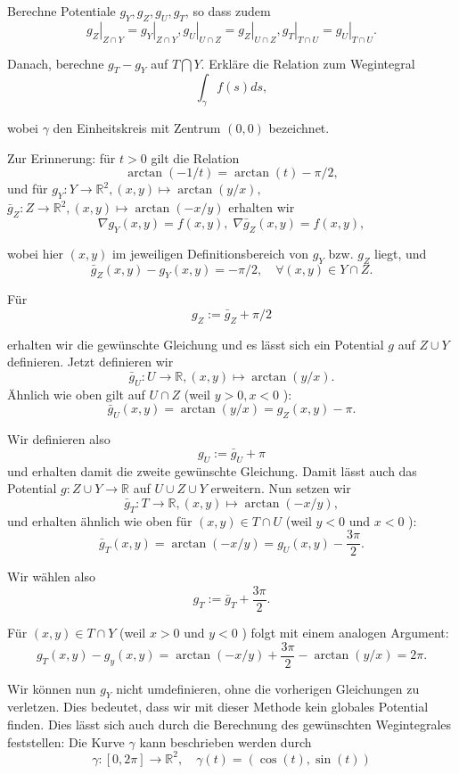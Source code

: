 Berechne Potentiale $g_{Y}, g_{Z}, g_{U}, g_{T}$, so dass zudem
$$
\left.g_{Z}\right|_{Z \cap Y}=\left.g_{Y}\right|_{Z \cap Y},\left.g_{U}\right|_{U \cap Z}=\left.g_{Z}\right|_{U \cap Z},\left.g_{T}\right|_{T \cap U}=\left.g_{U}\right|_{T \cap U} .
$$

Danach, berechne $g_{T}-g_{Y}$ auf $T \bigcap Y$. Erkläre die Relation zum Wegintegral
$$
\int_{\gamma} f(s) d s,
$$

wobei $\gamma$ den Einheitskreis mit Zentrum $(0,0)$ bezeichnet. \smallskip

Zur Erinnerung: für $t>0$ gilt die Relation
$$
\arctan (-1 / t)=\arctan (t)-\pi / 2,
$$
und für $g_{Y}: Y \rightarrow \mathbb{R}^{2},(x, y) \mapsto \arctan (y / x),$ 
$\bar{g}_{Z}: Z \rightarrow \mathbb{R}^{2},(x, y) \mapsto \arctan (-x / y)$ erhalten wir
$$
\nabla g_{Y}(x, y)=f(x, y), \; \nabla \bar{g}_{Z}(x, y)=f(x, y),
$$

wobei hier $(x, y)$ im jeweiligen Definitionsbereich von $g_{Y}$ bzw. $g_{Z}$ liegt, und
$$
\bar{g}_{Z}(x, y)-g_{Y}(x, y)=-\pi / 2, \quad \forall(x, y) \in Y \cap Z .
$$

Für
$$
g_{Z}:=\bar{g}_{Z}+\pi / 2
$$

erhalten wir die gewünschte Gleichung und es lässt sich ein Potential $g$ auf $Z \cup Y$ definieren. Jetzt definieren wir
$$
\bar{g}_{U}: U \rightarrow \mathbb{R},(x, y) \mapsto \arctan (y / x) .
$$
Ähnlich wie oben gilt auf $U \cap Z$ (weil $y>0, x<0$ ):
$$\bar{g}_{U}(x, y) =\arctan (y / x) = g_{Z}(x, y)-\pi .$$

Wir definieren also
$$
g_{U}:=\bar{g}_{U}+\pi
$$
und erhalten damit die zweite gewünschte Gleichung. Damit lässt auch das Potential $g: Z \cup Y \rightarrow \mathbb{R}$ auf $U \cup Z \cup Y$ erweitern. Nun setzen wir
$$
\bar{g}_{T}: T \rightarrow \mathbb{R},(x, y) \mapsto \arctan (-x / y),
$$
und erhalten ähnlich wie oben für $(x, y) \in T \cap U$ (weil $y<0$ und $x<0$ ):
$$\bar{g}_{T}(x, y) = \arctan (-x / y) = g_{U}(x, y)-\frac{3 \pi}{2} .$$

Wir wählen also
$$
g_{T}:=\bar{g}_{T}+\frac{3 \pi}{2} .
$$

Für $(x, y) \in T \cap Y$ (weil $x>0$ und $y<0$ ) folgt mit einem analogen Argument:
$$
g_{T}(x, y) - g_{y}(x, y) = \arctan (-x / y) + \frac{3 \pi}{2} - \arctan (y / x) = 2 \pi .
$$

Wir können nun $g_{Y}$ nicht umdefinieren, ohne die vorherigen Gleichungen zu verletzen. Dies bedeutet, dass wir mit dieser Methode kein globales Potential finden. Dies lässt sich auch durch die Berechnung des gewünschten Wegintegrales feststellen: Die Kurve $\gamma$ kann beschrieben werden durch
$$
\gamma:[0,2 \pi] \rightarrow \mathbb{R}^{2}, \quad \gamma(t)=(\cos (t), \sin (t))
$$

